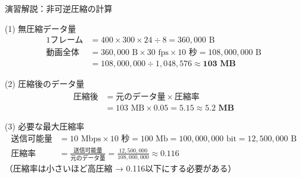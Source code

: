 \documentclass[aspectratio=43,professionalfonts,handout,10pt]{beamer}
\begin{document}

\ifnum{}
\begin{frame}[shrink=15]{演習解説：非可逆圧縮の計算}
  \begin{block}{(1) 無圧縮データ量}
    \small
    \begin{align*}
      \text{1フレーム} &= 400 \times 300 \times 24 \div 8 = 360{,}000 \text{ B} \\
      \text{動画全体} &= 360{,}000 \text{ B} \times 30 \text{ fps} \times 10 \text{ 秒}
                       = 108{,}000{,}000 \text{ B} \\
                      &= 108{,}000{,}000 \div 1{,}048{,}576 \approx \mathbf{103 \text{ MB}}
    \end{align*}
  \end{block}

  \begin{block}{(2) 圧縮後のデータ量}
    \small
    \begin{align*}
      \text{圧縮後} &= \text{元のデータ量} \times \text{圧縮率} \\
                    &= 103 \text{ MB} \times 0.05 = 5.15 \approx \mathbf{5.2 \text{ MB}}
    \end{align*}
  \end{block}

  \begin{block}{(3) 必要な最大圧縮率}
    \small
    \begin{align*}
      \text{送信可能量} &= 10 \text{ Mbps} \times 10 \text{ 秒}
                         = 100 \text{ Mb} = 100{,}000{,}000 \text{ bit}
                         = 12{,}500{,}000 \text{ B} \\
      \text{圧縮率} &= \frac{\text{送信可能量}}{\text{元のデータ量}}
                     = \frac{12{,}500{,}000}{108{,}000{,}000} \approx \mathbf{0.116}
    \end{align*}
    \footnotesize（圧縮率は小さいほど高圧縮 → 0.116以下にする必要がある）
  \end{block}
\end{frame}
\fi

\end{document}
